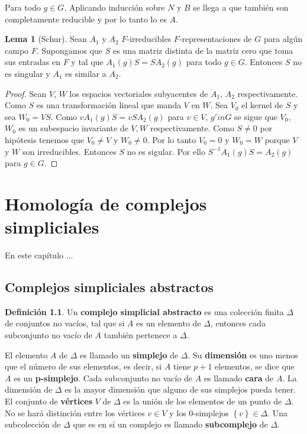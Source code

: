 \documentclass[12pt]{book}
\theoremstyle{definition}
\newtheorem{definition}[theorem]{Definición}
\newtheorem{lemma}[theorem]{Lema}
\newcounter{in}
\newcounter{ini}
\newcommand{\rep}{A}
\begin{document}
Para todo $g \in G$. Aplicando inducción sobre $N$ y $B$ se llega a
que también son completamente reducible y por lo tanto lo es
$\rep$.
\begin{lemma}[Schur]
  \label{shf}
  Sean $\rep_{1}$ y $\rep_{2}$ $F$-irreducibles
  $F$-representaciones de $G$ para algún campo $F$. Supongamos que $S$
  es una matriz distinta de la matriz cero que toma sus entradas en
  $F$ y tal que $\rep_{1}(g)S=S\rep_{2}(g)$ para todo
  $g \in G$. Entonces $S$ no es singular y $\rep_{1}$ es
  similar a $\rep_{2}$.
\end{lemma}
\begin{proof}
  Sean $V$, $W$ los espacios vectoriales subyacentes de
  $\rep_{1}$, $\rep_{2}$ respectivamente. Como $S$ es
  una transformación lineal que manda $V$ en $W$. Sea $V_{0}$ el
  kernel de $S$ y sea $W_{0} =VS$. Como
  $v\rep_{1}(g)S=vS\rep_{2}(g)$ para $v \in V$,
  $g 'in G$ se sigue que $V_{0}$, $W_{0}$ es un subespacio invariante
  de $V,W$ respectivamente. Como $S \neq 0$ por hipótesis tenemos que
  $V_{0} \neq V$ y $W_{0} \neq 0$. Por lo tanto $V_{0}=0$ y $W_{0}=W$
  porque $V$ y $W$ son irreducibles. Entonces $S$ no es sigular. Por
  ello $S^{-1}\rep_{1}(g)S=\rep_{2}(g)$ para $g \in G$.
\end{proof}

\chapter{Homología de complejos simpliciales}
\label{hsc}
En este capítulo ...

\section{Complejos simpliciales abstractos}
\label{asc}

\begin{definition}
  \label{dasc}
  Un \textbf{complejo simplicial abstracto} es una colección
  finita $\Delta$ de conjuntos no vacíos, tal que si $A$ es un
  elemento de $\Delta$, entonces cada subconjunto no vacío de $A$
  también pertenece a $\Delta$.
\end{definition}

El elemento $A$ de $\Delta$ es llamado un \textbf{simplejo}
de $\Delta$. Su \textbf{dimensión} es uno menos que el número
de sus elementos, es decir, si $A$ tiene $p+1$ elementos, se dice que
$A$ es un \textbf{p-simplejo}. Cada subconjunto no vacío de
$A$ es llamado \textbf{cara} de $A$.  La dimensión de $\Delta$
  es la mayor dimensión que alguno de sus simplejos pueda tener. El
  conjunto de \textbf{vértices} $V$ de $\Delta$ es la unión
  de los elementos de un punto de $\Delta$. No se hará distinción
  entre los vértices $v \in V$ y los $0$-simplejos
  $\left\{ v \right\} \in \Delta$. Una subcolección de $\Delta$ que es
  en sí un complejo es llamado \textbf{subcomplejo} de
    $\Delta$.
\end{document}
